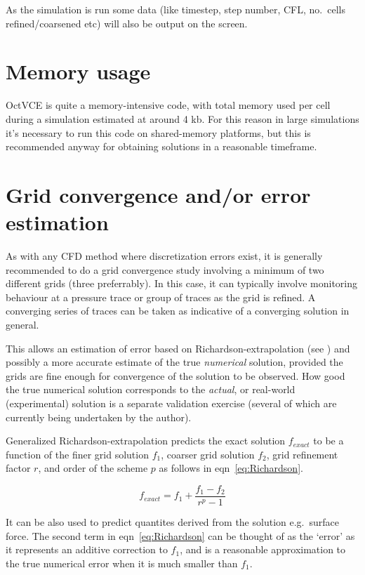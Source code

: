 \documentclass[pdftex, 12pt, a4paper]{report}
\begin{document}
As the simulation is run some data (like timestep, step number, CFL, no.\ cells refined/coarsened etc) will also be output on the screen.

\section{Memory usage}\label{sec:mem_use}

OctVCE is quite a memory-intensive code, with total memory used per cell during a simulation estimated at around 4 kb.  For this reason 
in large simulations it's necessary to run this code on shared-memory platforms, but this is recommended anyway for obtaining
solutions in a reasonable timeframe.    

\section{Grid convergence and/or error estimation}\label{sec:sim_error}

As with any CFD method where discretization errors exist, it is generally recommended to do a grid convergence study involving
a minimum of two different grids (three preferrably).  In this case, it can typically involve monitoring behaviour at a pressure trace
or group of traces as the grid is refined.  A converging series of traces can be taken as indicative of a converging solution in general.

This allows an estimation of error based on Richardson-extrapolation
(see \cite{Roache:book,Roy:ro}) and possibly a more accurate estimate of the true \emph{numerical} solution, provided 
the grids are fine enough for convergence of the solution to be observed.  How good the true numerical solution corresponds
to the \emph{actual}, or real-world (experimental) solution is a separate validation exercise (several of which are currently
being undertaken by the author).

Generalized Richardson-extrapolation predicts the exact solution $f_{exact}$ to be a function of the finer grid solution $f_1$,
coarser grid solution $f_2$, grid refinement factor $r$, and order of the scheme $p$ as follows in eqn~\ref{eq:Richardson}.

\begin{equation}\label{eq:Richardson}
  f_{exact} = f_1 + \frac{f_1 - f_2}{r^p - 1}
\end{equation}

It can be also used to predict quantites derived from the solution e.g.\ surface force.  The second term in eqn~\ref{eq:Richardson}
can be thought of as the `error' as it represents an additive correction to $f_1$, and is a reasonable approximation to the
true numerical error when it is much smaller than $f_1$.  
\end{document}
